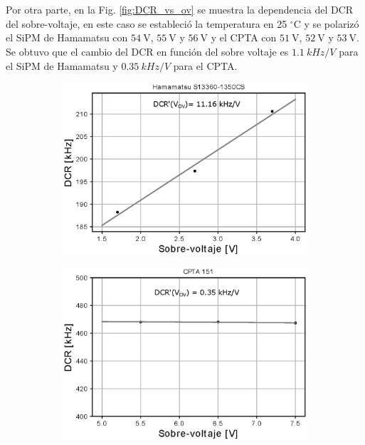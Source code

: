 \begin{figure}[h!]
\begin{subfigure}[b]{0.49\textwidth}
         \label{fig:DCR_T_CPTA}
     \end{subfigure}
        \label{fig:DCR_vs_T}
\end{figure}
\\ \\
Por otra parte, en la Fig. \ref{fig:DCR_vs_ov} se muestra la dependencia del DCR del sobre-voltaje, en este caso se estableció la temperatura en 25  $^\circ$C y se polarizó  el SiPM de Hamamatsu con $54~\mbox{V}$, $55~\mbox{V}$ y $56~\mbox{V}$ y el CPTA con $51~\mbox{V}$, $52~\mbox{V}$ y $53~\mbox{V}$. Se obtuvo que el cambio del DCR en función del sobre voltaje es $1.1~kHz/V$ para el SiPM de Hamamatsu y $0.35~kHz/V$ para el CPTA.
\begin{figure}[h!]
     \centering
        \caption{Tasa de conteo oscuro en función del sobre-voltaje para los SiPM S13360-1350CS de Hamamatsu (izquierda) y CPTA 151 (derecha). Se puede observar que los cambios en el sobre-voltaje tienen más influencia en el DCR para el SiPM de Hamamatsu que para el CPTA.}
     \begin{subfigure}[b]{0.49\textwidth}
         \centering
         \includegraphics[width=1.1\textwidth]{Images/DCR_vs_ov_1350CS.eps}
         \label{fig:DCR_ov_1350CS}
     \end{subfigure}
     \begin{subfigure}[b]{0.49\textwidth}
         \centering
         \includegraphics[width=1.1\textwidth]{Images/DCR_vs_ov_CPTA.eps}

\end{subfigure}
\end{figure}
